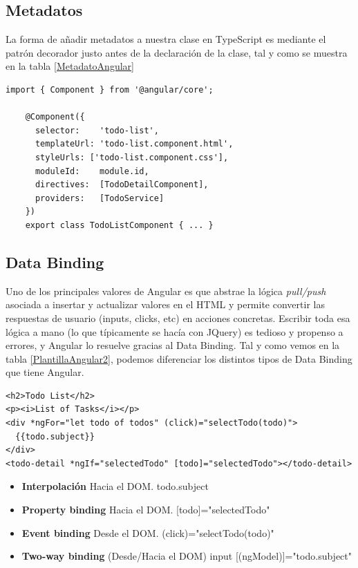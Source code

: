 \subsection{Metadatos} La forma de añadir metadatos a nuestra clase en TypeScript es mediante el patrón decorador justo antes de la declaración de la clase, tal y como se muestra en la tabla \ref{MetadatoAngular}
\begin{lstlisting}[caption={Metadatos en Angular }, label=MetadatoAngular]
   import { Component } from '@angular/core';

    @Component({
      selector:    'todo-list',
      templateUrl: 'todo-list.component.html',
      styleUrls: ['todo-list.component.css'],
      moduleId:    module.id,
      directives:  [TodoDetailComponent],
      providers:   [TodoService]
    })
    export class TodoListComponent { ... }
\end{lstlisting}


\subsection{Data Binding}
Uno de los principales valores de Angular es que abstrae la lógica \textit{pull/push} asociada a insertar y actualizar valores en el HTML y permite convertir las respuestas de usuario (inputs, clicks, etc) en acciones concretas. Escribir toda esa lógica a mano (lo que típicamente se hacía con JQuery) es tedioso y propenso a errores, y Angular lo resuelve gracias al Data Binding.
Tal y como vemos en la tabla \ref{PlantillaAngular2}, podemos diferenciar los distintos tipos de Data Binding que tiene Angular.
\begin{lstlisting}[caption=Data Binding en Angular, label=PlantillaAngular2]
<h2>Todo List</h2>
<p><i>List of Tasks</i></p>
<div *ngFor="let todo of todos" (click)="selectTodo(todo)">
  {{todo.subject}}
</div>
<todo-detail *ngIf="selectedTodo" [todo]="selectedTodo"></todo-detail>
\end{lstlisting}
\begin{itemize}
\item \textbf{Interpolación} Hacia el DOM.
{{todo.subject}}
\item \textbf{Property binding} Hacia el DOM.
[todo]="selectedTodo"
\item \textbf{Event binding} Desde el DOM. (click)="selectTodo(todo)"

\item \textbf{Two-way binding} (Desde/Hacia el DOM) input [(ngModel)]="todo.subject"
\end{itemize}

